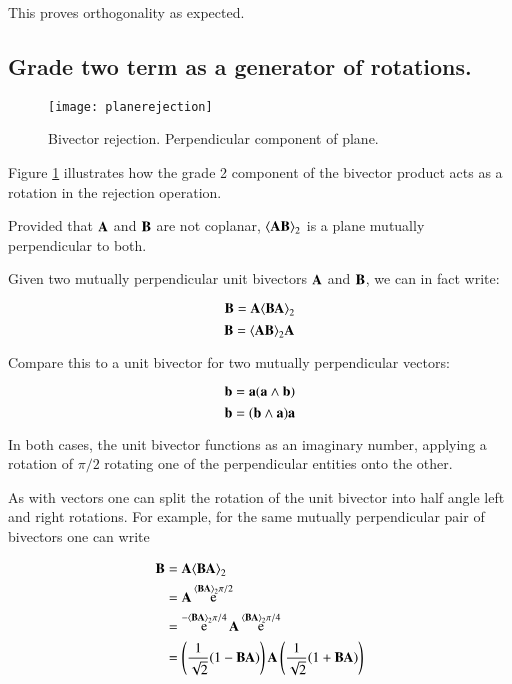 \documentclass{article}      %
\DeclareMathOperator{\Exp}{e}
\newcommand{\gpgrade}[2] {{\left\langle{{#1}}\right\rangle}_{#2}}
\newcommand{\gpgradetwo}[1] {\gpgrade{#1}{2}}
\begin{document}
This proves orthogonality as expected.

\subsection{ Grade two term as a generator of rotations. }

\begin{figure}[htp]
\centering
\texttt{[image: planerejection]}
\caption{Bivector rejection.  Perpendicular component of plane.}\label{fig:planerejection}
\end{figure}

Figure \ref{fig:planerejection} illustrates how the grade 2 component of the
bivector product acts as a rotation in the rejection operation.

Provided that $\mathbf{A}$ and $\mathbf{B}$ are not coplanar, $\gpgradetwo{\BA\BB}$ is a plane mutually perpendicular to both.


Given two mutually perpendicular unit bivectors ${\mathbf{A}}$ and ${\mathbf{B}}$, we can in fact write: 

\[
{\BB} = {\BA}\gpgradetwo{{\BB}{\BA}}
\]
\[
{\BB} = \gpgradetwo{{\BA}{\BB}}{\BA}
\]

Compare this to a unit bivector for two mutually perpendicular vectors:

\[
\mathbf{b} = \mathbf{a} (\mathbf{a} \wedge \mathbf{b})
\]
\[
\mathbf{b} = (\mathbf{b} \wedge \mathbf{a}) \mathbf{a}
\]

In both cases, the unit bivector functions as an imaginary number,
applying a rotation of $\pi/2$ rotating one of the 
perpendicular entities onto the other.

As with vectors one can split the rotation of the unit bivector into half
angle left and right rotations.  For example, for the same mutually
perpendicular pair of bivectors one can write

\begin{align*}
\BB 
&= \BA\gpgradetwo{\BB \BA} \\
&= \BA \Exp^{\gpgradetwo{\BB \BA}\pi/2} \\
&= \Exp^{-\gpgradetwo{\BB \BA}\pi/4} \BA \Exp^{\gpgradetwo{\BB \BA}\pi/4} \\
&= \left(\inv{\sqrt{2}}(1 - \BB \BA)\right) \BA \left(\inv{\sqrt{2}}(1 + \BB \BA) \right) \\
\end{align*}
\end{document}
